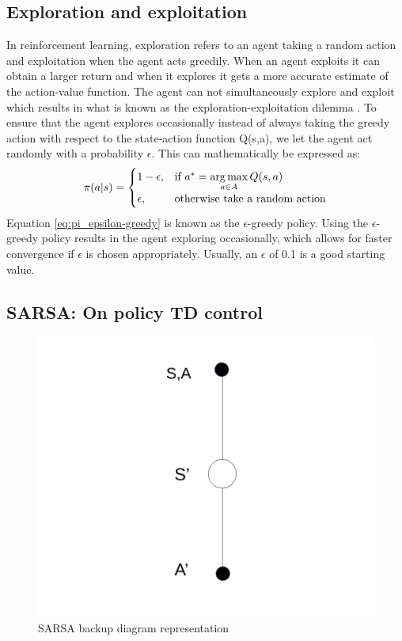 \subsection{Exploration and exploitation}
In reinforcement learning, exploration refers to an agent taking a random action and exploitation when the agent acts greedily. When an agent exploits it can obtain a larger return and when it explores it gets a more accurate estimate of the action-value function. The agent can not simultaneously explore and exploit which results in what is known as the exploration-exploitation dilemma \cite{e_greedy_Michel_T}.
To ensure that the agent explores occasionally instead of always taking the greedy action with respect to the state-action function Q(s,a), we let the agent act randomly with a probability $\epsilon$. This can mathematically be expressed as:
\begin{align}
	\pi(a|s)=\begin{cases}
		1-\epsilon, & \text{if $a^* = \operatorname*{arg\,max}\limits_{a \in A}Q (s,a)$}\\
		\epsilon, & \text{otherwise take a random action}
	\end{cases}
	\label{eq:pi_epsilon-greedy}
\end{align}
Equation \ref{eq:pi_epsilon-greedy} is known as the $\epsilon$-greedy policy. 
Using the $\epsilon$-greedy policy results in the agent exploring occasionally, which allows for faster convergence if $\epsilon$ is chosen appropriately. Usually, an $\epsilon$ of 0.1 is a good starting value.

\subsection{SARSA: On policy TD control}
\begin{figure}[!htb]
	\centering
	\includegraphics[width=0.5\linewidth]{RL/fig/sarsa_state_diagram.pdf}
	\caption{SARSA backup diagram representation\cite{David_Silver}}
	\label{fig:sarsa_state_diagram}	
\end{figure}

